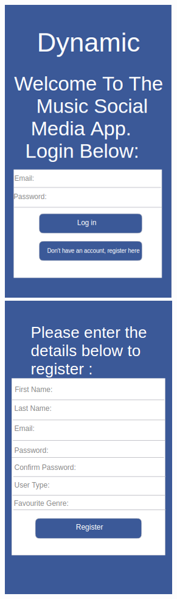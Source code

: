 \begin{figure}[H]
\includegraphics[scale=0.5]{images/ui1}
\includegraphics[scale=0.5]{images/ui2}

\end{figure}
